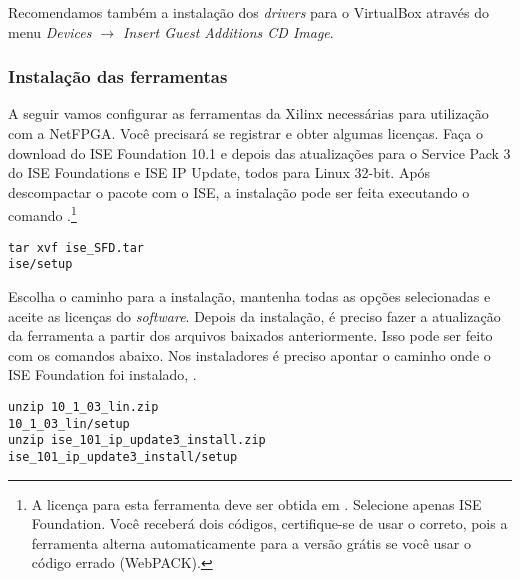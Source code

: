 Recomendamos também a instalação dos \emph{drivers} para o VirtualBox
através do menu \emph{Devices $\rightarrow$ Insert Guest Additions CD
Image}.

\subsubsection{Instalação das ferramentas}
\label{ssec:tools}

A seguir vamos configurar as ferramentas da Xilinx necessárias para
utilização com a NetFPGA.  Você precisará se registrar e obter algumas
licenças.  Faça o download do ISE Foundation 10.1 e depois das
atualizações para o Service Pack 3 do ISE Foundations e ISE IP Update,
todos para Linux 32-bit.  Após descompactar o pacote com o ISE, a
instalação pode ser feita executando o comando .\footnote{A
licença para esta ferramenta deve ser obtida em
.  Selecione apenas ISE Foundation.
Você receberá dois códigos, certifique-se de usar o correto, pois a
ferramenta alterna automaticamente para a versão grátis se você usar o
código errado (WebPACK).}

\begin{verbatim}
tar xvf ise_SFD.tar
ise/setup
\end{verbatim}

Escolha o caminho  para a instalação, mantenha
todas as opções selecionadas e aceite as licenças do \emph{software}.
Depois da instalação, é preciso fazer a atualização da ferramenta a
partir dos arquivos baixados anteriormente. Isso pode ser feito com os
comandos abaixo.  Nos instaladores é preciso apontar o caminho onde o
ISE Foundation foi instalado, .

\begin{verbatim}
unzip 10_1_03_lin.zip
10_1_03_lin/setup
unzip ise_101_ip_update3_install.zip
ise_101_ip_update3_install/setup
\end{verbatim}

